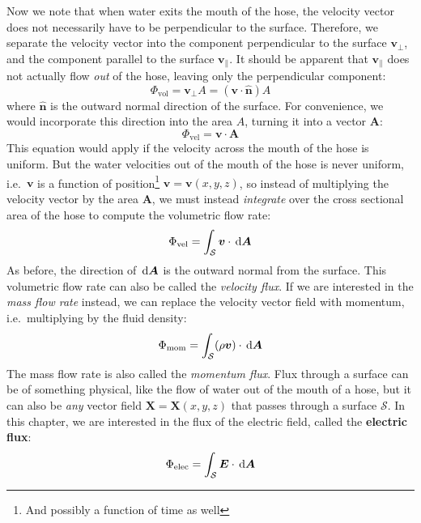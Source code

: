 Now we note that when water exits the mouth of the hose, the velocity vector
does not necessarily have to be perpendicular to the surface. Therefore, we
separate the velocity vector into the component perpendicular to the surface
$\bm v_\perp$, and the component parallel to the surface $\bm v_\parallel$. It
should be apparent that $\bm v_\parallel$ does not actually flow \emph{out} of
the hose, leaving only the perpendicular component:
\begin{equation*}
  \Phi_\text{vol}=\bm v_\perp A=(\bm v\cdot\hat{\bm n})A
\end{equation*}
where $\hat{\bm n}$ is the outward normal direction of the surface. For
convenience, we would incorporate this direction into the area $A$, turning it
into a vector $\bm A$:
\begin{equation*}
  \Phi_\text{vel}=\bm v\cdot\bm A
\end{equation*}
This equation would apply if the velocity across the mouth of the hose is
uniform. But the water velocities out of the mouth of the hose is never
uniform, i.e.\ $\bm v$ is a function of position\footnote{And possibly a
function of time as well} $\bm v=\bm v(x,y,z)$, so instead of multiplying the
velocity vector by the area $\bm A$, we must instead \emph{integrate} over the
cross sectional area of the hose to compute the volumetric flow rate:
\begin{equation*}
  \Phi_\text{vel}=\int_{\mathcal S}\bm v\cdot\dl{\bm A}
\end{equation*}
As before, the direction of $\dl{\bm A}$ is the outward normal from the surface.
This volumetric flow rate can also be called the \emph{velocity flux}. If we
are interested in the \emph{mass flow rate} instead, we can replace the
velocity vector field with momentum, i.e.\ multiplying by the fluid density:
\begin{equation*}
  \Phi_\text{mom}=\int_{\mathcal S}(\rho\bm v)\cdot\dl{\bm A}
\end{equation*}
The mass flow rate is also called the \emph{momentum flux}. Flux through a
surface can be of something physical, like the flow of water out of the mouth
of a hose, but it can also be \emph{any} vector field $\bm X=\bm X(x,y,z)$ that
passes through a surface $\mathcal S$. In this chapter, we are interested in
the flux of  the electric field, called the \textbf{electric flux}:
\begin{equation}
  \Phi_\text{elec}=\int_{\mathcal S}\bm E\cdot\dl{\bm A}
\end{equation}


